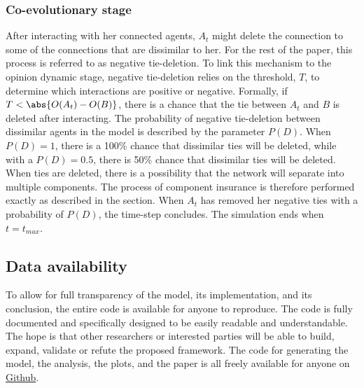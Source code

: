 \documentclass[11pt]{article}
\DeclarePairedDelimiter{\abs}\lvert\rvert
\begin{document}
\subsubsection{Co-evolutionary stage}
After interacting with her connected agents, $A_t$ might delete the connection to some of the connections that are dissimilar to her. For the rest of the paper, this process is referred to as negative tie-deletion. 
To link this mechanism to the opinion dynamic stage, negative tie-deletion relies on the threshold, $T$, to determine which interactions are positive or negative. Formally, if $T < \abs{O(A_t) - O(B)}$, there is a chance that the tie between $A_t$ and $B$ is deleted after interacting. The probability of negative tie-deletion between dissimilar agents in the model is described by the parameter $P(D)$.
When $P(D) = 1$, there is a 100\% chance that dissimilar ties will be deleted, while with a $P(D) = 0.5$, there is 50\% chance that dissimilar ties will be deleted. 
When ties are deleted, there is a possibility that the network will separate into multiple components. The process of component insurance is therefore performed exactly as described in the \textit{} section. 
When $A_t$ has removed her negative ties with a probability of $P(D)$, the time-step concludes. The simulation ends when $t = t_{max}$.

\subsection{Data availability}
To allow for full transparency of the model, its implementation, and its conclusion, the entire code is available for anyone to reproduce. The code is fully documented and specifically designed to be easily readable and understandable.
The hope is that other researchers or interested parties will be able to build, expand, validate or refute the proposed framework. The code for generating the model, the analysis, the plots, and the paper is all freely available for anyone on  \href{https://github.com/Gotticketsto360tour/LaDoN}{Github}.
\end{document}
